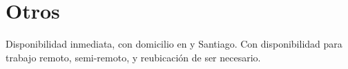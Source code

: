 \documentclass{my_cv}
\begin{document}
\section{Otros \faPaperPlane}
Disponibilidad inmediata, con domicilio en {\valpo}  y Santiago. Con disponibilidad para trabajo remoto, semi-remoto, y reubicaci\'on de ser necesario. 

\end{document}
